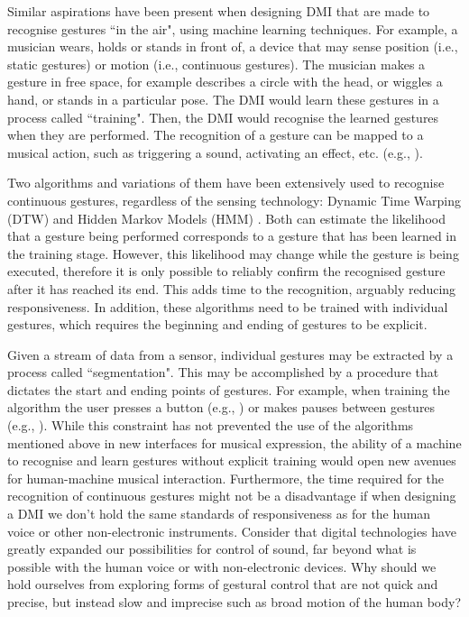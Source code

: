 \documentclass{nime-alternate_MANUSCRIPT} %
\begin{document}
\vfill\eject

Similar aspirations have been present when designing DMI that are made to recognise gestures ``in the air", using machine learning techniques. For example, a musician wears, holds or stands in front of, a device that may sense position (i.e., static gestures) or motion (i.e., continuous gestures). The musician makes a gesture in free space, for example describes a circle with the head, or wiggles a hand, or stands in a particular pose. The DMI would learn these gestures in a process called ``training". Then, the DMI would recognise the learned gestures when they are performed. The recognition of a gesture can be mapped to a musical action, such as triggering a sound, activating an effect, etc. (e.g., \cite{Gillian_2011}).

Two algorithms and variations of them have been extensively used to recognise continuous gestures, regardless of the sensing technology: Dynamic Time Warping (DTW) \cite{Gillian_etal_2011} and Hidden Markov Models (HMM) \cite{Bevilacqua_etal_2010}. Both can estimate the likelihood that a gesture being performed corresponds to a gesture that has been learned in the training stage. However, this likelihood may change while the gesture is being executed, therefore it is only possible to reliably confirm the recognised gesture after it has reached its end. 
This adds time to the recognition, arguably reducing responsiveness. In addition, these algorithms need to be trained with individual gestures, which requires the beginning and ending of gestures to be explicit.

Given a stream of data from a sensor, individual gestures may be extracted by a process called ``segmentation". This may be accomplished by a procedure that dictates the start and ending points of gestures. For example, when training the algorithm the user presses a button (e.g., \cite{Merril_Paradiso_2005}) or makes pauses between gestures (e.g., \cite{Murad_etal_2017}). While this constraint has not prevented the use of the algorithms mentioned above in new interfaces for musical expression, the ability of a machine to recognise and learn gestures without explicit training would open new avenues for human-machine musical interaction. Furthermore, the time required for the recognition of continuous gestures might not be a disadvantage if when designing a DMI we don't hold the same standards of responsiveness as for the human voice or other non-electronic instruments. Consider that digital technologies have greatly expanded our possibilities for control of sound, far beyond what is possible with the human voice or with non-electronic devices. Why should we hold ourselves from exploring forms of gestural control that are not quick and precise, but instead slow and imprecise such as broad motion of the human body?
	
\end{document}
